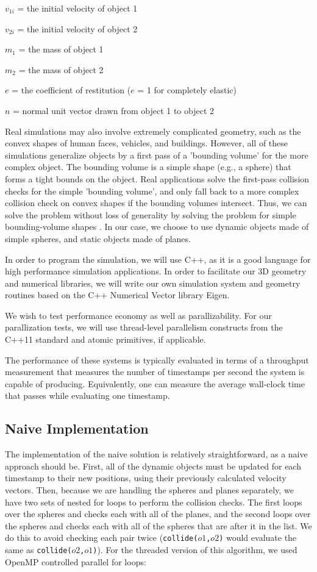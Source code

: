 \documentclass[conference]{IEEEtran}
\begin{document}
$v_{1i}$ = the initial velocity of object 1

$v_{2i}$ = the initial velocity of object 2

$m_1$ = the mass of object 1

$m_2$ = the mass of object 2

$e$ = the coefficient of restitution ($e$ = 1 for completely elastic)

$n$ = normal unit vector drawn from object 1 to object 2


Real simulations may also involve extremely complicated geometry, such as the convex shapes of human faces, vehicles, and buildings.  However, 
all of these simulations generalize objects by a first pass of a 'bounding volume' for the more complex object.  The bounding volume is a simple shape (e.g., a sphere)
that forms a tight bounds on the object.  Real applications solve the first-pass collision checks for the simple 'bounding volume', and only fall back to a more complex
collision check on convex shapes if the bounding volumes intersect.  Thus, we can solve the problem without loss of generality by solving the problem
for simple bounding-volume shapes \cite{uberflow,cloth}.  In our case, we choose to use dynamic objects made of simple spheres, and static objects made of planes.

In order to program the simulation, we will use C++, as it is a good language for high performance simulation applications.  In order to facilitate our 
3D geometry and numerical libraries, we will write our own simulation system and geometry routines based on the C++ Numerical Vector library Eigen.  

We wish to test performance economy as well as parallizability.  For our parallization tests, we will use thread-level parallelism constructs from the C++11 standard and atomic primitives, if applicable.

The performance of these systems is typically evaluated in terms of a throughput measurement that measures the number of timestamps per second the system is capable of producing.  Equivalently, one can measure the average wall-clock time that passes while evaluating one timestamp.

\subsection{Naive Implementation}

The implementation of the naive solution is relatively straightforward, as a naive approach should be.  First, all of the dynamic objects must be updated for each timestamp to their new positions, using their previously calculated velocity vectors.  Then, because we are handling the spheres and planes separately, we have two sets of nested for loops to perform the collision checks.  The first loops over the spheres and checks each with all of the planes, and the second loops over the spheres and checks each with all of the spheres that are after it in the list.  We do this to avoid checking each pair twice (\texttt{collide($o1$,$o2$)} would evaluate the same as \texttt{collide($o2$,$o1$)}). For the threaded version of this algorithm, we used OpenMP controlled parallel for loops:
\end{document}
